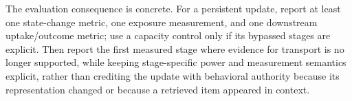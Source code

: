 The evaluation consequence is concrete. For a persistent update, report at least one state-change metric, one exposure measurement, and one downstream uptake/outcome metric; use a capacity control only if its bypassed stages are explicit. Then report the first measured stage where evidence for transport is no longer supported, while keeping stage-specific power and measurement semantics explicit, rather than crediting the update with behavioral authority because its representation changed or because a retrieved item appeared in context.
